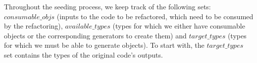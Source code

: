 \documentclass[sigconf,review,anonymous]{acmart}
\begin{document}









Throughout the seeding process, we keep track of the following sets:
$\mathit{consumable\_ objs}$ (inputs to the code to be refactored, which need to be consumed by the refactoring),  
$\mathit{available\_types}$ (types for which we either have consumable objects or the corresponding generators to create them) and 
$\mathit{target\_types}$ (types for which we must be able to generate objects). To start with, the $\mathit{target\_types}$ set
contains the types of the original code's outputs. %
\end{document}
